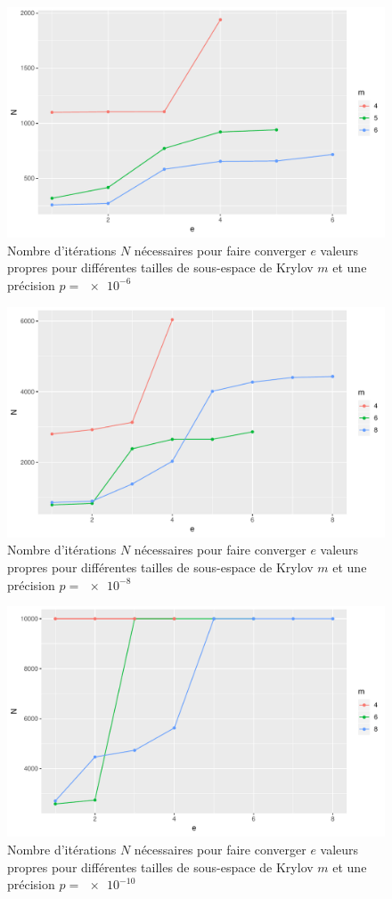 \documentclass[11pt,a4paper]{article}
\begin{document}
\begin{figure}
	\centering
	\includegraphics[width=0.8\linewidth, keepaspectratio]{plots/Nvse-m_p6.pdf}
	\caption{Nombre d'itérations $N$ nécessaires pour faire converger $e$ valeurs propres pour différentes tailles de sous-espace de Krylov $m$ et une précision $p=\SI{e-6}{}$ \label{fig:Nvse-m_p6}}
\end{figure}

\begin{figure}
	\centering
	\includegraphics[width=0.8\linewidth, keepaspectratio]{plots/Nvse-m_p8.pdf}
	\caption{Nombre d'itérations $N$ nécessaires pour faire converger $e$ valeurs propres pour différentes tailles de sous-espace de Krylov $m$ et une précision $p=\SI{e-8}{}$ \label{fig:Nvse-m_p8}}
\end{figure}

\begin{figure}
	\centering
	\includegraphics[width=0.8\linewidth, keepaspectratio]{plots/Nvse-m_p10.pdf}
	\caption{Nombre d'itérations $N$ nécessaires pour faire converger $e$ valeurs propres pour différentes tailles de sous-espace de Krylov $m$ et une précision $p=\SI{e-10}{}$ \label{fig:Nvse-m_p10}}
\end{figure}
\end{document}
